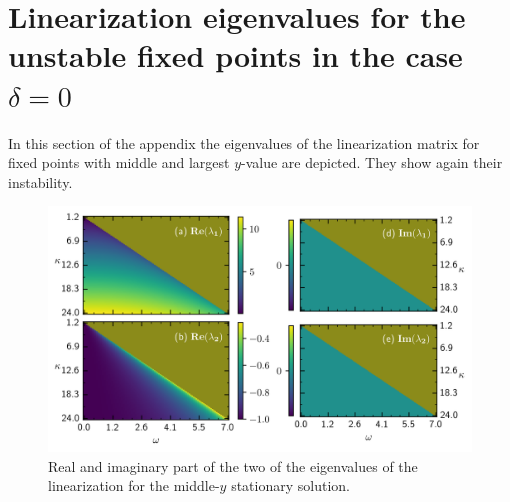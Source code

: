     
    
    \section{Linearization eigenvalues for the unstable fixed points in the case $\delta=0$}
    \label{appendix:eig_del0}
    In this section of the appendix the eigenvalues of the linearization matrix for fixed points with middle and largest $y$-value are depicted. They show again their instability.
    \begin{figure}[H]
        \centering
        \includegraphics{pictures/lam_anal_m1.png}
        \caption{Real and imaginary part of the two of the eigenvalues of the linearization for the middle-$y$ stationary solution.
        }
    \end{figure}
    
